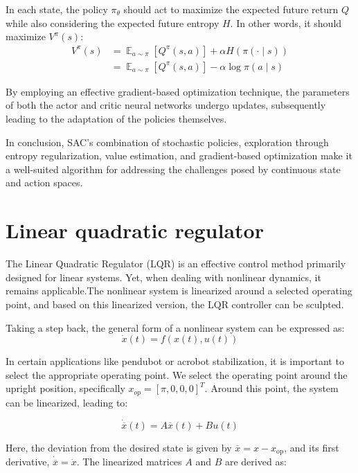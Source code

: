 In each state, the policy \(\pi_\theta\) should act to maximize the expected
future return \(Q\) while also considering the expected future entropy \(H\). In other
words, it should maximize \(V^\pi(s)\):
\begin{align}
 V^\pi(s) &= {\displaystyle \mathop{\mathbb{E}}_{a\sim\pi}[Q^\pi(s,a)]} +
 \alpha{H(\pi(\cdot\mid{s}))} \\
 &= {\displaystyle \mathop{\mathbb{E}}_{a\sim\pi}[Q^\pi(s,a)]} -
 \alpha{\log {\pi(a\mid{s})}}
\end{align}


By employing an effective gradient-based optimization technique, the parameters
of both the actor and critic neural networks undergo updates, subsequently
leading to the adaptation of the policies themselves.

In conclusion, SAC's combination of stochastic policies, exploration through
entropy regularization, value estimation, and gradient-based optimization make
it a well-suited algorithm for addressing the challenges posed by continuous
state and action spaces.

\section{Linear quadratic regulator}
The Linear Quadratic Regulator (LQR) is an effective control method primarily designed for linear systems. Yet, when dealing with nonlinear dynamics, it remains applicable.The nonlinear system is linearized around a selected operating point, and based on this linearized version, the LQR controller can be sculpted.

Taking a step back, the general form of a nonlinear system can be expressed as:
\begin{equation}
 \dot{x}(t) = f(x(t), u(t))
\end{equation}


In certain applications like pendubot or acrobot stabilization, it is important to select the appropriate operating point. We select the operating point around the upright position, specifically \(x_{op} = [\pi,0,0,0]^T\). Around this point, the system can be linearized, leading to:

\begin{equation}
\dot{\overline{x}}(t) = A \overline{x}(t) + B u(t)
\end{equation}


Here, the deviation from the desired state is given by \(\overline{x} = x - x_{\text{op}}\), and its first derivative, \(\dot{\overline{x}} = \dot{x}\). The linearized  matrices \(A\) and \(B\) are derived as:

